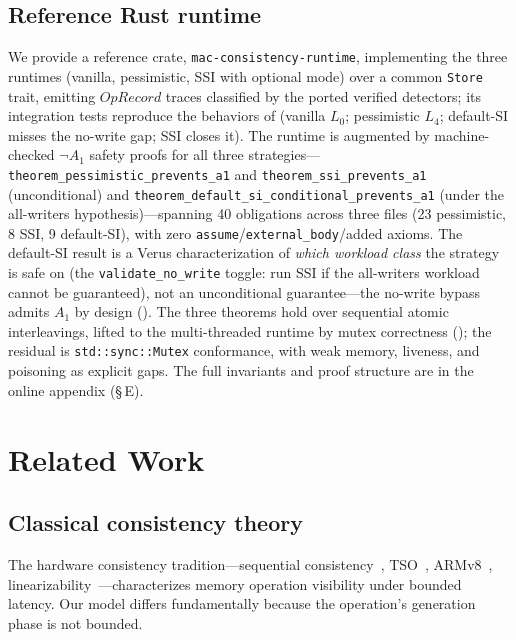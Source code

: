 \documentclass[journal,compsoc,10pt]{IEEEtran}
\providecommand{\citep}{\cite}
\theoremstyle{definition}
\theoremstyle{remark}
\newcommand{\fld}[1]{\mathit{#1}}
\begin{document}
\subsection{Reference Rust runtime}
\label{sec:rust-runtime}
We provide a reference crate, \texttt{mac-consistency-runtime}, implementing
the three runtimes (vanilla, pessimistic, SSI with optional mode) over a
common \texttt{Store} trait, emitting $\fld{OpRecord}$ traces classified by
the ported verified detectors; its integration tests reproduce the
behaviors of  (vanilla $L_0$; pessimistic
$L_4$; default-SI misses the no-write gap; SSI closes it). The runtime is
augmented by machine-checked $\neg A_1$ safety proofs for all three
strategies---\texttt{theorem\_pessimistic\_prevents\_a1} and
\texttt{theorem\_ssi\_prevents\_a1} (unconditional) and
\texttt{theorem\_default\_si\_conditional\_prevents\_a1} (under the
all-writers hypothesis)---spanning 40 obligations across three files (23
pessimistic, 8 SSI, 9 default-SI), with zero
\texttt{assume}/\texttt{external\_body}/added axioms. The default-SI result
is a Verus characterization of \emph{which workload class} the strategy is
safe on (the \texttt{validate\_no\_write} toggle: run SSI if the
all-writers workload cannot be guaranteed), not an unconditional
guarantee---the no-write bypass admits $A_1$ by design
(). The three theorems hold over sequential atomic
interleavings, lifted to the multi-threaded runtime by mutex correctness
(); the residual is
\texttt{std::sync::Mutex} conformance, with weak memory, liveness, and
poisoning as explicit gaps. The full invariants and proof structure are in
the online appendix (\S\,E).


\section{Related Work}
\label{sec:related}

\subsection{Classical consistency theory}
\label{sec:related-classical}
The hardware consistency tradition---sequential
consistency~\citep{Lamport1979SC}, TSO~\citep{GharachorlooEtAl1990},
ARMv8~\citep{PulteEtAl2018ARMv8},
linearizability~\citep{HerlihyWing1990}---characterizes memory
operation visibility under bounded latency. Our model differs
fundamentally because the operation's generation phase is not
bounded.
\end{document}

